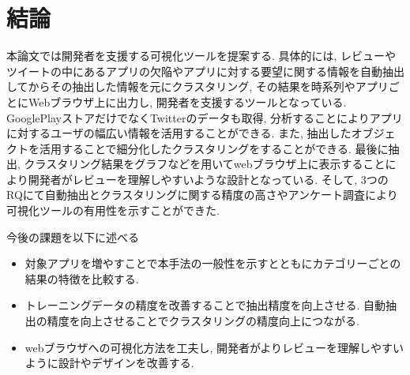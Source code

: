 \chapter{結論}
\label{chap:keturon}

本論文では開発者を支援する可視化ツールを提案する. 具体的には, レビューやツイートの中にあるアプリの欠陥やアプリに対する要望に関する情報を自動抽出してからその抽出した情報を元にクラスタリング,  その結果を時系列やアプリごとにWebブラウザ上に出力し, 開発者を支援するツールとなっている.
GooglePlayストアだけでなくTwitterのデータも取得, 分析することによりアプリに対するユーザの幅広い情報を活用することができる. また, 抽出したオブジェクトを活用することで細分化したクラスタリングをすることができる. 最後に抽出, クラスタリング結果をグラフなどを用いてwebブラウザ上に表示することにより開発者がレビューを理解しやすいような設計となっている. 
そして, 3つのRQにて自動抽出とクラスタリングに関する精度の高さやアンケート調査により可視化ツールの有用性を示すことができた. 

今後の課題を以下に述べる

\begin{itemize}
    \item 対象アプリを増やすことで本手法の一般性を示すとともにカテゴリーごとの結果の特徴を比較する. 
    \item トレーニングデータの精度を改善することで抽出精度を向上させる. 自動抽出の精度を向上させることでクラスタリングの精度向上につながる. 
    \item webブラウザへの可視化方法を工夫し, 開発者がよりレビューを理解しやすいように設計やデザインを改善する. 
\end{itemize}
